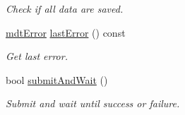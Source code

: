 \begin{DoxyCompactItemize}
\begin{DoxyCompactList}\small\item\em Check if all data are saved. \end{DoxyCompactList}\item 
\hyperlink{classmdt_error}{mdt\-Error} \hyperlink{classmdt_abstract_sql_table_controller_a085ff6b261917b19b130e30123a166ad}{last\-Error} () const 
\begin{DoxyCompactList}\small\item\em Get last error. \end{DoxyCompactList}\item 
bool \hyperlink{classmdt_abstract_sql_table_controller_ab1d75ed2eb77baf4324cea09e281c91e}{submit\-And\-Wait} ()
\begin{DoxyCompactList}\small\item\em Submit and wait until success or failure. \end{DoxyCompactList}\end{DoxyCompactItemize}
